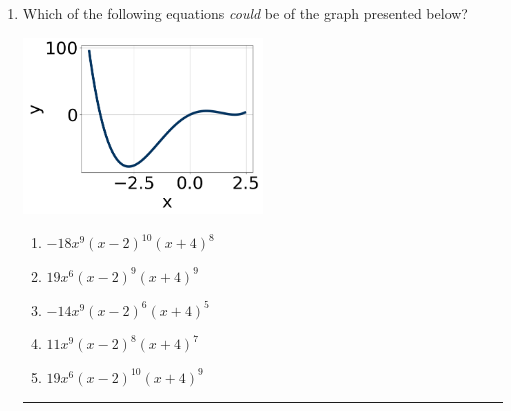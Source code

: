 \documentclass[14pt]{extbook}
\newcommand{\litem}[1]{\item#1\hspace*{-1cm}\rule{\textwidth}{0.4pt}}
\begin{document}
\begin{enumerate}
{\begin{enumerate}[label=\Alph*.]
\end{enumerate} }
\litem{
Which of the following equations \textit{could} be of the graph presented below?
\begin{center}
    \includegraphics[width=0.5\textwidth]{../Figures/polyGraphToFunctionCopyA.png}
\end{center}
\begin{enumerate}[label=\Alph*.]
\item \( -18x^{9} (x - 2)^{10} (x + 4)^{8} \)
\item \( 19x^{6} (x - 2)^{9} (x + 4)^{9} \)
\item \( -14x^{9} (x - 2)^{6} (x + 4)^{5} \)
\item \( 11x^{9} (x - 2)^{8} (x + 4)^{7} \)
\item \( 19x^{6} (x - 2)^{10} (x + 4)^{9} \)


\end{enumerate}}
\end{enumerate}
\end{document}

